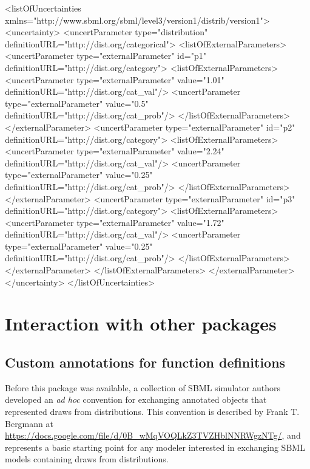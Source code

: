 \documentclass[draftspec]{sbmlpkgspec}
\begin{document}
\begin{example}
<listOfUncertainties xmlns="http://www.sbml.org/sbml/level3/version1/distrib/version1">
  <uncertainty>
    <uncertParameter type="distribution" definitionURL="http://dist.org/categorical">
      <listOfExternalParameters>
        <uncertParameter type="externalParameter" id="p1" definitionURL="http://dist.org/category">
          <listOfExternalParameters>
            <uncertParameter type="externalParameter" value="1.01"
                             definitionURL="http://dist.org/cat_val"/>
            <uncertParameter type="externalParameter" value="0.5"
                             definitionURL="http://dist.org/cat_prob"/>
          </listOfExternalParameters>
        </externalParameter>
        <uncertParameter type="externalParameter" id="p2" definitionURL="http://dist.org/category">
          <listOfExternalParameters>
            <uncertParameter type="externalParameter" value="2.24"
                             definitionURL="http://dist.org/cat_val"/>
            <uncertParameter type="externalParameter" value="0.25"
                             definitionURL="http://dist.org/cat_prob"/>
          </listOfExternalParameters>
        </externalParameter>
        <uncertParameter type="externalParameter" id="p3" definitionURL="http://dist.org/category">
          <listOfExternalParameters>
            <uncertParameter type="externalParameter" value="1.72"
                             definitionURL="http://dist.org/cat_val"/>
            <uncertParameter type="externalParameter" value="0.25"
                             definitionURL="http://dist.org/cat_prob"/>
          </listOfExternalParameters>
        </externalParameter>
      </listOfExternalParameters>
    </externalParameter>
  </uncertainty>
</listOfUncertainties>
\end{example}


\clearpage
\section{Interaction with other packages}

\subsection{Custom annotations for function definitions}
\label{sec:annotation-scheme}
Before this package was available, a collection of SBML simulator authors developed an \emph{ad hoc} convention for exchanging annotated \FunctionDefinition objects that represented draws from distributions.  This convention is described by Frank T. Bergmann at \url{https://docs.google.com/file/d/0B_wMqVOQLkZ3TVZHblNNRWgzNTg/}, and represents a basic starting point for any modeler interested in exchanging SBML models containing draws from distributions.
\end{document}

